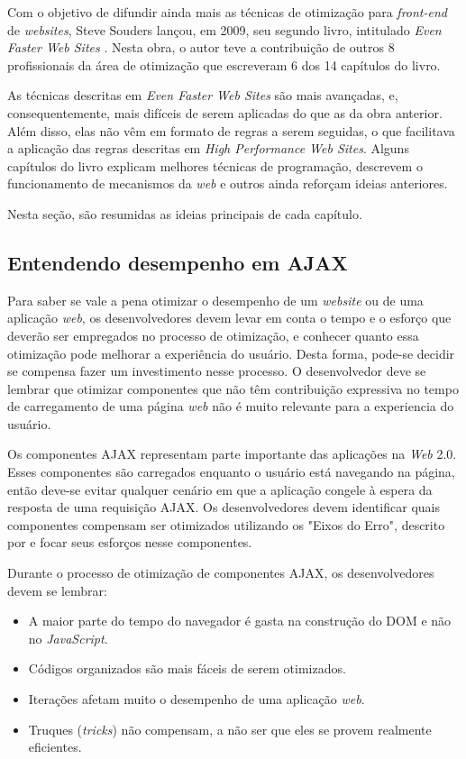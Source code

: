 Com o objetivo de difundir ainda mais as técnicas de otimização para \textit{front-end} de \textit{websites}, Steve Souders lançou, em 2009, seu segundo livro, intitulado \textit{Even Faster Web Sites} \cite{HighPerformance}. Nesta obra, o autor teve a contribuição de outros 8 profissionais da área de otimização que escreveram 6 dos 14 capítulos do livro.

As técnicas descritas em \textit{Even Faster Web Sites} são mais avançadas, e, consequentemente, mais difíceis de serem aplicadas do que as da obra anterior. Além disso, elas não vêm em formato de regras a serem seguidas, o que facilitava a aplicação das regras descritas em \textit{High Performance Web Sites}. Alguns capítulos do livro explicam melhores técnicas de programação, descrevem o funcionamento de mecanismos da \textit{web} e outros ainda reforçam ideias anteriores.

Nesta seção, são resumidas as ideias principais de cada capítulo.

\subsection{Entendendo desempenho em AJAX}
\label{subsec:evenfaster_cap1}
Para saber se vale a pena otimizar o desempenho de um \textit{website} ou de uma aplicação \textit{web}, os desenvolvedores devem levar em conta o tempo e o esforço que deverão ser empregados no processo de otimização, e conhecer quanto essa otimização pode melhorar a experiência do usuário. Desta forma, pode-se decidir se compensa fazer um investimento nesse processo. O desenvolvedor deve se lembrar que otimizar componentes que não têm contribuição expressiva no tempo de carregamento de uma página \textit{web} não é muito relevante para a experiencia do usuário.

Os componentes AJAX representam parte importante das aplicações na \textit{Web} 2.0. Esses componentes são carregados enquanto o usuário está navegando na página, então deve-se evitar qualquer cenário em que a aplicação congele à espera da resposta de uma requisição AJAX. Os desenvolvedores devem identificar quais componentes compensam ser otimizados utilizando os "Eixos do Erro", descrito por  e focar seus esforços nesse componentes.

Durante o processo de otimização de componentes AJAX, os desenvolvedores devem se lembrar:
\begin{itemize}
	\item A maior parte do tempo do navegador é gasta na construção do DOM e não no \textit{JavaScript}.
	\item Códigos organizados são mais fáceis de serem otimizados.
	\item Iterações afetam muito o desempenho de uma aplicação \textit{web}.
	\item Truques (\textit{tricks}) não compensam, a não ser que eles se provem realmente eficientes.
\end{itemize}

